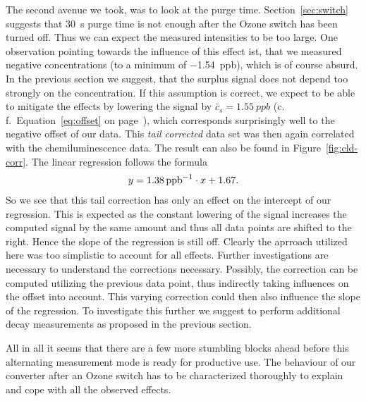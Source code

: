 The second avenue we took, was to look at the purge time.
Section~\ref{sec:switch} suggests that \SI{30}{\second} purge time is
not enough after the Ozone switch has been turned off. Thus we can
expect the measured  intensities to be too large. One
observation pointing towards the influence of this effect ist, that we
measured negative  concentrations (to a minimum of
\SI{-1.54}{ppb}), which is of course absurd. In the previous section
we suggest, that the surplus  signal does not depend too
strongly on the  concentration. If this assumption is correct,
we expect to be able to mitigate the effects by lowering the 
signal by $\bar c_s = \SI{1.55}{ppb}$ (c.\,f.\
Equation~\eqref{eq:offset} on page~\pageref{eq:offset}), which
corresponds surprisingly well to the negative offset of our data. This
\emph{tail corrected} data set was then again correlated with the
chemiluminescence data. The result can also be found in
Figure~\ref{fig:cld-corr}. The linear regression follows the formula
\begin{align*}
  y = \SI{1.38}{ppb\tothe{-1}} \cdot x + 1.67.
\end{align*}
So we see that this tail correction has only an effect on the
intercept of our regression. This is expected as the constant lowering
of the \ch{NO2} signal increases the computed \ch{NO} signal by the
same amount and thus all data points are shifted to the
right. Hence the slope of the regression is still off. Clearly the
aprroach utilized here was too simplistic to account for all
effects. Further investigations are necessary to understand the
corrections necessary. Possibly, the  correction can be
computed utilizing the previous  data point, thus indirectly
taking \ch{NO} influences on the offset into account. This varying 
correction could then also influence the slope of the
regression. To investigate this further we suggest to perform
additional decay measurements as proposed in the previous section.

All in all it seems that there are a few more stumbling blocks ahead
before this alternating measurement mode is ready for productive
use. The behaviour of our converter after an Ozone switch has to be
characterized thoroughly to explain and cope with all the observed
effects.

